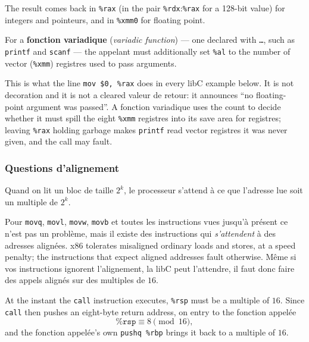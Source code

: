 \begin{definition}
  The result comes back in \texttt{\%rax} (in the pair
  \texttt{\%rdx}:\texttt{\%rax} for a 128-bit value) for integers and pointeurs,
  and in \texttt{\%xmm0} for floating point.
\end{definition}

\begin{definition}
  For a \textbf{fonction variadique} (\textit{variadic function}) --- one
  declared with \texttt{\dots}, such as \texttt{printf} and \texttt{scanf} ---
  the appelant must additionally set \texttt{\%al} to the number of vector
  (\texttt{\%xmm}) registres used to pass arguments.
\end{definition}

This is what the line \texttt{mov \$0, \%rax} does in every libC example below.
It is not decoration and it is not a cleared valeur de retour: it announces ``no
floating-point argument was passed''. A fonction variadique uses the count to
decide whether it must spill the eight \texttt{\%xmm} registres into its save
area for registres; leaving \texttt{\%rax} holding garbage makes \texttt{printf}
read vector registres it was never given, and the call may fault.

\subsubsection{Questions d'alignement}
\begin{definition}
  Quand on lit un bloc de taille $2^{k}$, le processeur s'attend à ce que
  l'adresse lue soit un multiple de $2^{k}$.
\end{definition}
Pour \texttt{movq}, \texttt{movl}, \texttt{movw}, \texttt{movb} et toutes les
instructions vues jusqu'à présent ce n'est pas un problème, mais il existe des
instructions qui \emph{s'attendent} à des adresses alignées. x86 tolerates
misaligned ordinary loads and stores, at a speed penalty; the instructions that
expect aligned addresses fault otherwise. Même si vos instructions ignorent
l'alignement, la libC peut l'attendre, il faut donc faire des appels alignés sur
des multiples de $16$.

\begin{definition}
  At the instant the \texttt{call} instruction executes, \texttt{\%rsp} must be
  a multiple of $16$. Since \texttt{call} then pushes an eight-byte return
  address, on entry to the fonction appelée
  \[
    \texttt{\%rsp} \equiv 8 \pmod{16},
  \]
  and the fonction appelée's own \texttt{pushq \%rbp} brings it back to a
  multiple of $16$.
\end{definition}

